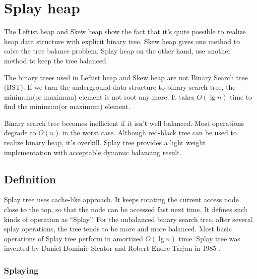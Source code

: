 \documentclass{article}
\begin{document}

\section{Splay heap}
\label{splayheap}

The Leftist heap and Skew heap show the fact that it's quite possible to realize
heap data structure with explicit binary tree.
Skew heap gives one method to solve the tree balance problem. Splay heap
on the other hand, use another method to keep the tree balanced.

The binary trees used in Leftist heap and Skew heap
are not Binary Search tree (BST). If we turn the underground
data structure to binary search tree, the minimum(or maximum)
element is not root any more. It takes $O(\lg n)$ time
to find the minimum(or maximum) element.

Binary search tree becomes inefficient if it isn't well
balanced. Most operations degrade to $O(n)$ in the worst case.
Although red-black tree can be used to realize
binary heap, it's overkill. Splay tree provides a light weight
implementation with acceptable dynamic balancing result.


\subsection{Definition}

Splay tree uses cache-like approach. It keeps rotating the current
access node close to the top, so that the node can be accessed fast
next time. It defines such kinds of operation as ``Splay''. For the
unbalanced binary search tree, after several splay operations, the
tree tends to be more and more balanced. Most basic operations of
Splay tree perform in amortized $O(\lg n)$ time. Splay tree was invented
by Daniel Dominic Sleator and Robert Endre Tarjan in 1985\cite{wiki-splay-tree}
\cite{self-adjusting-trees}.

\subsubsection{Splaying}
\end{document}
